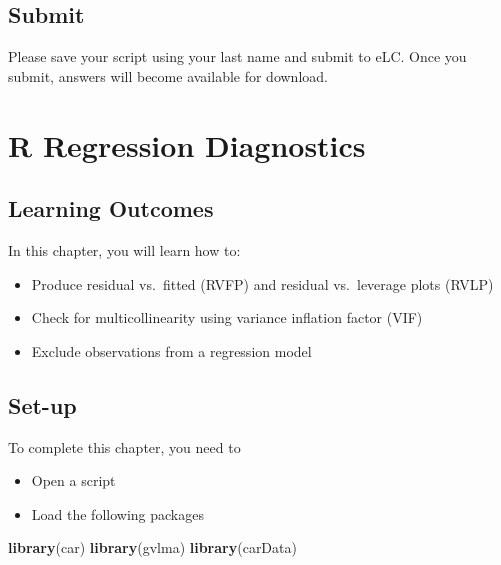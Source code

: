 \documentclass[
]{book}
\newenvironment{Shaded}{\begin{snugshade}}{\end{snugshade}}
\newcommand{\KeywordTok}[1]{\textcolor[rgb]{0.13,0.29,0.53}{\textbf{#1}}}
\newcommand{\NormalTok}[1]{#1}
\providecommand{\tightlist}{%
  \setlength{\itemsep}{0pt}\setlength{\parskip}{0pt}}
\begin{document}
\hypertarget{submit}{%
\section{Submit}\label{submit}}

Please save your script using your last name and submit to eLC. Once you submit, answers will become available for download.

\hypertarget{r-regression-diagnostics}{%
\chapter{R Regression Diagnostics}\label{r-regression-diagnostics}}

\hypertarget{learning-outcomes}{%
\section{Learning Outcomes}\label{learning-outcomes}}

In this chapter, you will learn how to:

\begin{itemize}
\tightlist
\item
  Produce residual vs.~fitted (RVFP) and residual vs.~leverage plots (RVLP)
\item
  Check for multicollinearity using variance inflation factor (VIF)
\item
  Exclude observations from a regression model
\end{itemize}

\hypertarget{set-up}{%
\section{Set-up}\label{set-up}}

To complete this chapter, you need to

\begin{itemize}
\tightlist
\item
  Open a script
\item
  Load the following packages
\end{itemize}

\begin{Shaded}
\begin{Highlighting}[]
\KeywordTok{library}\NormalTok{(car)}
\KeywordTok{library}\NormalTok{(gvlma)}
\KeywordTok{library}\NormalTok{(carData)}
\end{Highlighting}
\end{Shaded}
\end{document}
